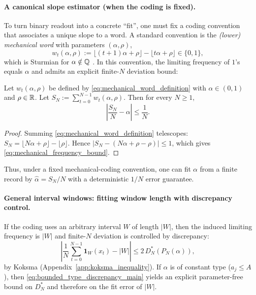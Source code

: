 \paragraph{A canonical slope estimator (when the coding is fixed).}
To turn binary readout into a concrete ``fit'', one must fix a coding convention that associates a unique slope to a word.
A standard convention is the \emph{(lower) mechanical word} with parameters $(\alpha,\rho)$,
\begin{equation}
w_t(\alpha,\rho):=\bigl\lfloor (t+1)\alpha+\rho\bigr\rfloor-\bigl\lfloor t\alpha+\rho\bigr\rfloor\in\{0,1\},
\label{eq:mechanical_word_definition}
\end{equation}
which is Sturmian for $\alpha\notin\mathbb{Q}$ \cite{Lothaire2002}.
In this convention, the limiting frequency of $1$'s equals $\alpha$ and admits an explicit finite-$N$ deviation bound:
\begin{lemma}
\label{lem:mechanical_prefix_frequency}
Let $w_t(\alpha,\rho)$ be defined by \eqref{eq:mechanical_word_definition} with $\alpha\in(0,1)$ and $\rho\in\mathbb{R}$.
Let $S_N:=\sum_{t=0}^{N-1} w_t(\alpha,\rho)$.
Then for every $N\ge 1$,
\begin{equation}
\left|\frac{S_N}{N}-\alpha\right|\le \frac{1}{N}.
\label{eq:mechanical_frequency_bound}
\end{equation}
\end{lemma}
\begin{proof}
Summing \eqref{eq:mechanical_word_definition} telescopes:
$S_N=\lfloor N\alpha+\rho\rfloor-\lfloor \rho\rfloor$.
Hence $|S_N-(N\alpha+\rho-\rho)|\le 1$, which gives \eqref{eq:mechanical_frequency_bound}.
\end{proof}
\noindent
Thus, under a fixed mechanical-coding convention, one can fit $\alpha$ from a finite record by $\widehat\alpha=S_N/N$ with a deterministic $1/N$ error guarantee.

\paragraph{General interval windows: fitting window length with discrepancy control.}
If the coding uses an arbitrary interval $W$ of length $|W|$, then the induced limiting frequency is $|W|$ and finite-$N$ deviation is controlled by discrepancy:
\begin{equation}
\left|\frac{1}{N}\sum_{t=0}^{N-1}\mathbf{1}_W(x_t)-|W|\right|\le 2\,D_N^\ast\!\left(P_N(\alpha)\right),
\end{equation}
by Koksma (Appendix~\ref{app:koksma_inequality}).
If $\alpha$ is of constant type ($a_j\le A$), then \eqref{eq:bounded_type_discrepancy_main} yields an explicit parameter-free bound on $D_N^\ast$ and therefore on the fit error of $|W|$.

